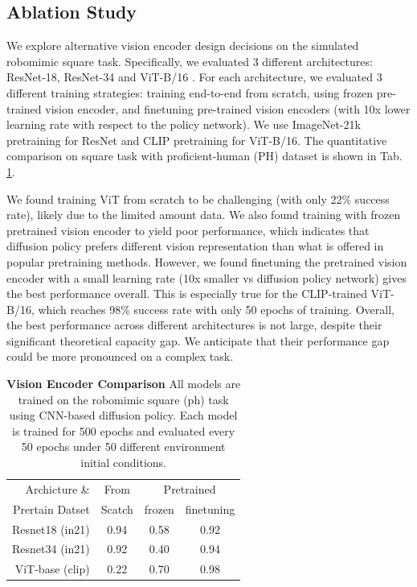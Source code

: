 \subsection{Ablation Study}
\label{sec:arch_ablation}
We explore alternative vision encoder design decisions on the simulated robomimic square task.
Specifically, we evaluated 3 different architectures:
ResNet-18, ResNet-34 \cite{resnet}
and ViT-B/16 \cite{dosovitskiy2020image}.
For each architecture, we evaluated 3 different training strategies:
training end-to-end from scratch,
using frozen pre-trained vision encoder,
and finetuning pre-trained vision encoders (with 10x lower learning rate with respect to the policy network).
We use ImageNet-21k \cite{ridnik2021imagenet21k} pretraining for ResNet and CLIP \cite{radford2021learning} pretraining for ViT-B/16.
The quantitative comparison on square task with proficient-human (PH) dataset is shown in Tab. \ref{tab:ablation_vision_encorder}.

We found training ViT from scratch to be challenging (with only 22\% success rate), likely due to the limited amount data.
We also found training with frozen pretrained vision encoder to yield poor performance, which indicates that diffusion policy prefers different vision representation than what is offered in popular pretraining methods.
However, we found finetuning the pretrained vision encoder with a small learning rate (10x smaller vs diffusion policy network) gives the best performance overall. This is especially true for the CLIP-trained ViT-B/16, which reaches 98\% success rate with only 50 epochs of training.
Overall, the best performance across different architectures is not large, despite their significant theoretical capacity gap. We anticipate that their performance gap could be more pronounced on a complex task.

\begin{table}
\centering
\begin{tabular}{r|c|cc}
\toprule
Archicture \& & From & \multicolumn{2}{c}{Pretrained} \\
Prertain Datset& Scatch & frozen & finetuning \\
\midrule
Resnet18 (in21) & 0.94   & 0.58      & 0.92             \\
Resnet34 (in21)& 0.92   & 0.40      & 0.94             \\
ViT-base (clip)& 0.22   & 0.70      & 0.98             \\
\bottomrule
\end{tabular}
\caption{\textbf{Vision Encoder Comparison} All models are trained on the robomimic square (ph) task using CNN-based diffusion policy. Each model is trained for 500 epochs and evaluated every 50 epochs under 50 different environment initial conditions.}
\label{tab:ablation_vision_encorder}
\vspace{-2mm}
\end{table}


